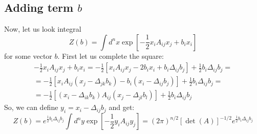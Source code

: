 \documentclass{article}
\begin{document}
\subsection{Adding term $b$}
Now, let us look integral
\begin{equation}
    Z(b) = \int d^nx \exp[-\frac{1}{2}x_iA_{ij}x_j + b_ix_i]
\end{equation}
for some vector $b$. First let us complete the square:
\begin{equation}
\begin{gathered}
    -\frac{1}{2}x_iA_{ij}x_j + b_ix_i = -\frac{1}{2}\left[x_iA_{ij}x_j - 2 b_ix_i + b_i \Delta_{ij}b_j\right] + \frac{1}{2} b_i \Delta_{ij}b_j = \\ =
    -\frac{1}{2}\left[x_i A_{ij} (x_j - \Delta_{jk} b_k) - b_i (x_i - \Delta_{ij}b_j)\right] + \frac{1}{2} b_i \Delta_{ij}b_j = \\ =
    -\frac{1}{2}\left[(x_i - \Delta_{ik}b_k) A_{ij}(x_j - \Delta_{jl}b_l)\right] + \frac{1}{2} b_i \Delta_{ij}b_j
\end{gathered}
\end{equation}
So, we can define $y_i = x_i - \Delta_{ij}b_j$ and get:
\begin{equation}
    Z(b) = e^{\frac{1}{2} b_i \Delta_{ij}b_j}\int d^ny \exp[-\frac{1}{2}y_iA_{ij}y_j] = (2\pi)^{n/2}\left[\det(A)\right]^{-1/2}e^{\frac{1}{2} b_i \Delta_{ij}b_j}
\end{equation}
\end{document}

